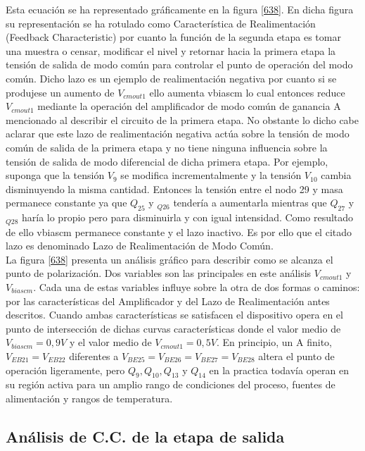 \documentclass[12pt,a4paper,final,headinclude,footinclude,BCOR5mm]{scrartcl}
\begin{document}
Esta ecuación se ha representado gráficamente en la figura \ref{638}. En dicha figura su representación se ha rotulado como Característica de Realimentación (Feedback Characteristic) por cuanto la función de la segunda etapa es tomar una muestra o censar, modificar el nivel y retornar hacia la primera etapa la tensión de salida de modo común para controlar el punto de operación del modo común. Dicho lazo es un ejemplo de realimentación negativa por cuanto si se produjese un aumento de $V_{cmout1}$ ello aumenta vbiascm lo cual entonces reduce $V_{cmout1}$ mediante la operación del amplificador de modo común de ganancia A mencionado al describir el circuito de la primera etapa. No obstante lo dicho cabe aclarar que este lazo de realimentación negativa actúa sobre la tensión de modo común de salida de la primera etapa y no tiene ninguna influencia sobre la tensión de salida de modo diferencial de dicha primera etapa. Por ejemplo, suponga que la tensión $V_{9}$ se modifica incrementalmente y la tensión $V_{10}$ cambia disminuyendo la misma cantidad. Entonces la tensión entre el nodo 29 y masa permanece constante ya que $Q_{25}$ y $_{Q26}$ tendería a aumentarla mientras que $Q_{27}$ y $_{Q28}$ haría lo propio pero para disminuirla y con igual intensidad. Como resultado de ello vbiascm permanece constante y el lazo inactivo. Es por ello que el citado lazo es denominado Lazo de Realimentación de Modo Común.\\

La figura \ref{638} presenta un análisis gráfico para describir como se alcanza el punto de polarización. Dos variables son las principales en este análisis $V_{cmout1}$ y $V_{biascm}$. Cada una de estas variables influye sobre la otra de dos formas o caminos: por las características del Amplificador y del Lazo de Realimentación antes descritos. Cuando ambas características se satisfacen el dispositivo opera en el punto de intersección de dichas curvas características donde el valor medio de $V_{biascm} = 0,9 V$ y el valor medio de $V_{cmout1} = 0,5 V$. En principio, un A finito, $V_{EB21} = V_{EB22}$  diferentes a $V_{BE25} = V_{BE26} = V_{BE27} = V_{BE28}$ altera el punto de operación ligeramente, pero $Q_{9},Q_{10},Q_{13}$ y $Q_{14}$  en la practica todavía operan en su región activa para un amplio rango de condiciones del proceso, fuentes de alimentación y rangos de temperatura.

\subsection{Análisis de C.C. de la etapa de salida}
\end{document}
